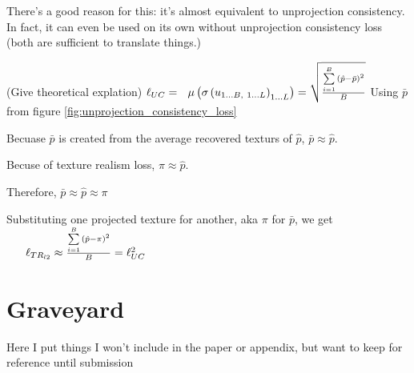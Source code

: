 \documentclass{article}
\begin{document}
		There's a good reason for this: it's almost equivalent to unprojection consistency.
		In fact, it can even be used on its own without unprojection consistency loss (both are sufficient to translate things.)

		(Give theoretical explation)
		$
		\ell_{UC} = 
		\
		\
		\mu\left(\sigma\left(u_{1\dots B,\ 1\dots L}\right)_{1 \dots L}\right) = 
		\sqrt{
		\frac{
			\sum\limits_{i=1}^B {
				\left( \hat{p}-\bar{p}  \right)^2
				} 
			}
			{B}
		}
		$
		Using $\bar{p}$ from figure \ref{fig:unprojection_consistency_loss}

		Becuase $\bar{p}$ is created from the average recovered texturs of $\hat{p}$, $\bar{p} \approx \hat{p}$.

		Becuse of texture realism loss, $\pi \approx \hat{p}$.

		Therefore, $\bar{p} \approx \hat{p} \approx \pi$



		Substituting one projected texture for another, aka $\pi$ for $\bar{p}$, we get 
		$ \
		\
		\
		\
		\ \ell_{TR_{l2}}
		\approx
		\frac{\sum\limits_{i=1}^B {
			\left( \hat{p}-\pi  \right)^2
			}}{B} = \ell_{UC}^2
		$


\section*{Graveyard}

Here I put things I won't include in the paper or appendix, but want to keep for reference until submission
\end{document}
